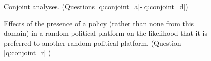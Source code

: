 \documentclass[12pt,english]{article}
\begin{document}
\begin{figure}[h!]
    \caption[Conjoint analyses]{Conjoint analyses. (Questions \ref{q:conjoint_a}-\ref{q:conjoint_d})}\label{fig:conjoint}
\end{figure}

\begin{figure}[h!] 
    \caption[Preferences for various policies in political platforms]{Effects of the presence of a policy (rather than none from this domain) in a random political platform on the likelihood that it is preferred to another random political platform. (Question \ref{q:conjoint_r}%
    )}\label{fig:ca_r}
\end{figure}
\end{document}

